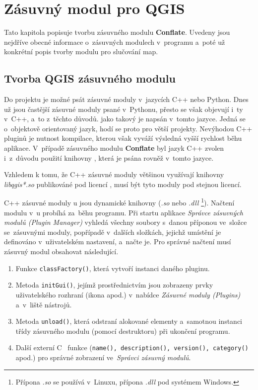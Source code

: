\chapter{Zásuvný modul pro QGIS}
\label{6-plugin}

Tato kapitola popisuje tvorbu zásuvného modulu \textbf{Conflate}.
Uvedeny jsou nejdříve obecné informace o~zásuvných modulech v~programu
 a~poté už kon\-krétní popis tvorby modulu pro 
slučování map. 

\section{Tvorba QGIS zásuvného modulu}
\label{plugin-tvorba}

Do projektu  je možné psát zásuvné moduly v~jazycích C++ 
nebo Python. Dnes už jsou častější zásuvné moduly psané v~Pythonu, přesto 
se však objevují i~ty v~C++, a~to z~těchto důvodů.  jako takový 
je napsán v~tomto jazyce. Jedná se o~objektově orientovaný jazyk, hodí se 
proto pro větší projekty. Nevýhodou C++ pluginů je nutnost kompilace, kterou 
však vyváží výsledná vyšší rychlost běhu aplikace. V~případě zásuvného modulu 
\textbf{Conflate} byl jazyk C++ zvolen i~z~důvodu použití knihovny , 
která je psána rovněž v~tomto jazyce.

Vzhledem k tomu, že C++ zásuvné moduly většinou využívají  
knihovny \textit{libqgis*.so} publikováné pod licencí , musí být 
tyto moduly pod stejnou licencí.

C++ zásuvné moduly u jsou dynamické knihovny (\textit{.so} nebo 
\textit{.dll} \footnote{ Přípona \textit{.so} se používá v~Linuxu, přípona 
\textit{.dll} pod systémem Windows.}). Načtení modulu v~u probíhá 
za~běhu programu. Při startu aplikace \textit{Správce zásuvných mo\-dulů 
(Plugin Manager)} vyhledá všechny soubory s~danou příponou ve~složce 
se~zásuvnými moduly, popřípadě v~dalších složkách, jejichž umístění
je definováno v~uživatelském na\-stavení, a~načte je. Pro správné načtení musí 
zásuvný modul obsahovat následující.

\begin{enumerate}
 \item Funkce \texttt{classFactory()}, která vytvoří instanci daného pluginu.
 \item Metoda \texttt{initGui()}, jejímž prostřednictvím jsou zobrazeny prvky 
	uživatelského rozhraní (ikona apod.) v~nabídce \textit{Zásuvné moduly 
	(Plugins)} a~v~liště nástrojů.
 \item Metoda \texttt{unload()}, která odstraní alokované elementy a~samotnou
	instanci třídy zásuv\-ného modulu (pomocí destruktoru) při ukončení 
	programu.
 \item Další externí C ~funkce (\texttt{na\-me(), descrip\-tion(), version(),
	category()} apod.) pro správ\-né zobrazení ve~\textit{Správci zásuvný modulů}.
\end{enumerate}


